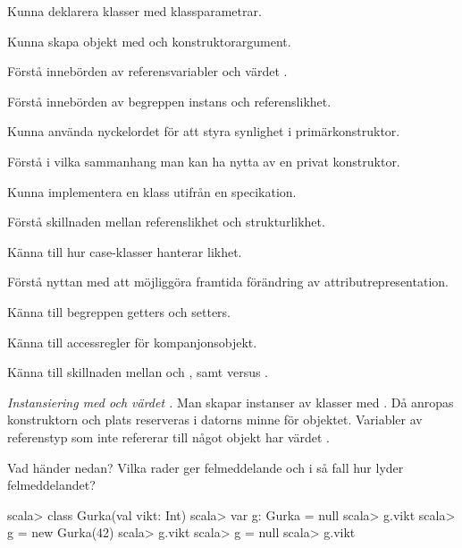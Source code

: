 

\Exercise{\ExeWeekSIX}\label{exe:W06}

\begin{Goals}
\item Kunna deklarera klasser med klassparametrar.
\item Kunna skapa objekt med  och konstruktorargument.
\item Förstå innebörden av referensvariabler och värdet .
\item Förstå innebörden av begreppen instans och referenslikhet.
\item Kunna använda nyckelordet  för att styra synlighet i primärkonstruktor.
\item Förstå i vilka sammanhang man kan ha nytta av en privat konstruktor.
\item Kunna implementera en klass utifrån en specikation.
\item Förstå skillnaden mellan referenslikhet och strukturlikhet.
\item Känna till hur case-klasser hanterar likhet.
\item Förstå nyttan med att möjliggöra framtida förändring av attributrepresentation.
\item Känna till begreppen getters och setters. 
\item Känna till accessregler för kompanjonsobjekt.
\item Känna till skillnaden mellan \code{==} och , samt \code{!=} versus .
\end{Goals}

\begin{Preparations}
\item {}
\end{Preparations}

\BasicTasks %

\Task \emph{Instansiering med  och värdet .} Man skapar instanser av klasser med . Då anropas konstruktorn och plats reserveras i datorns minne för objektet. Variabler av referenstyp som inte refererar till något objekt har värdet . 

\Subtask Vad händer nedan? Vilka rader ger felmeddelande och i så fall hur lyder felmeddelandet?

\begin{REPL}
scala> class Gurka(val vikt: Int)
scala> var g: Gurka = null
scala> g.vikt
scala> g = new Gurka(42)
scala> g.vikt
scala> g = null
scala> g.vikt
\end{REPL}

